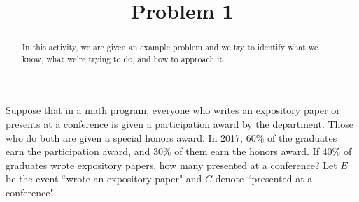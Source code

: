 \documentclass{ximera}
\title{Problem 1}
\begin{document}
      
\begin{abstract}
      
In this activity, we are given an example problem and we try to identify what we know, what we're trying to do, and how to approach it.
      
\end{abstract}
      
\maketitle
      
 
Suppose that in a math program, everyone who writes an expository paper or presents at a conference is given a participation award by the department.  Those who do both are given a special honors award.  In 2017, 60\% of the graduates earn the participation award, and 30\% of them earn the honors award.  If 40\% of graduates wrote expository papers, how many presented at a conference? Let $E$ be the event ``wrote an expository paper" and $C$ denote ``presented at a conference".
 
\end{document}
